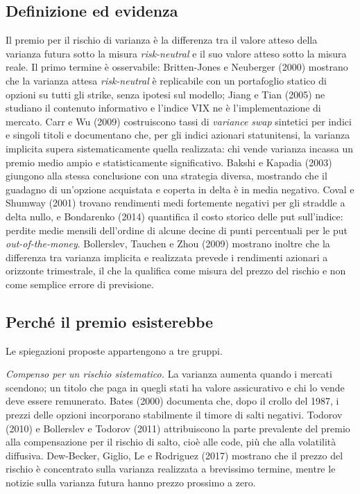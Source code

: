 \documentclass[11pt,a4paper]{article}
\begin{document}
\subsection{Definizione ed evidenza}

Il premio per il rischio di varianza è la differenza tra il valore atteso della varianza futura sotto la misura \emph{risk-neutral} e il suo valore atteso sotto la misura reale. Il primo termine è osservabile: Britten-Jones e Neuberger (2000) mostrano che la varianza attesa \emph{risk-neutral} è replicabile con un portafoglio statico di opzioni su tutti gli strike, senza ipotesi sul modello; Jiang e Tian (2005) ne studiano il contenuto informativo e l'indice VIX ne è l'implementazione di mercato. Carr e Wu (2009) costruiscono tassi di \emph{variance swap} sintetici per indici e singoli titoli e documentano che, per gli indici azionari statunitensi, la varianza implicita supera sistematicamente quella realizzata: chi vende varianza incassa un premio medio ampio e statisticamente significativo. Bakshi e Kapadia (2003) giungono alla stessa conclusione con una strategia diversa, mostrando che il guadagno di un'opzione acquistata e coperta in delta è in media negativo. Coval e Shumway (2001) trovano rendimenti medi fortemente negativi per gli straddle a delta nullo, e Bondarenko (2014) quantifica il costo storico delle put sull'indice: perdite medie mensili dell'ordine di alcune decine di punti percentuali per le put \emph{out-of-the-money}. Bollerslev, Tauchen e Zhou (2009) mostrano inoltre che la differenza tra varianza implicita e realizzata prevede i rendimenti azionari a orizzonte trimestrale, il che la qualifica come misura del prezzo del rischio e non come semplice errore di previsione.

\subsection{Perché il premio esisterebbe}

Le spiegazioni proposte appartengono a tre gruppi.

\emph{Compenso per un rischio sistematico.} La varianza aumenta quando i mercati scendono; un titolo che paga in quegli stati ha valore assicurativo e chi lo vende deve essere remunerato. Bates (2000) documenta che, dopo il crollo del 1987, i prezzi delle opzioni incorporano stabilmente il timore di salti negativi. Todorov (2010) e Bollerslev e Todorov (2011) attribuiscono la parte prevalente del premio alla compensazione per il rischio di salto, cioè alle code, più che alla volatilità diffusiva. Dew-Becker, Giglio, Le e Rodriguez (2017) mostrano che il prezzo del rischio è concentrato sulla varianza realizzata a brevissimo termine, mentre le notizie sulla varianza futura hanno prezzo prossimo a zero.
\end{document}
